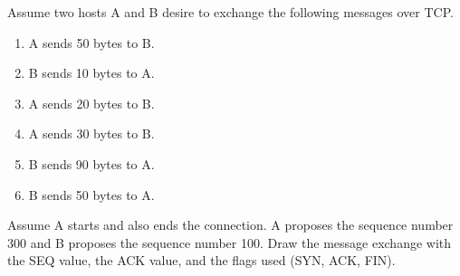 \begin{Exercise}
Assume two hosts A and B desire to exchange the following messages over TCP.

\begin{enumerate}
\item A sends 50 bytes to B.
\item B sends 10 bytes to A.
\item A sends 20 bytes to B.
\item A sends 30 bytes to B.
\item B sends 90 bytes to A.
\item B sends 50 bytes to A.
\end{enumerate}

Assume A starts and also ends the connection. A proposes the sequence number 300 and B proposes the sequence number 100. Draw the message exchange with the SEQ value, the ACK value, and the flags used (SYN, ACK, FIN).
\end{Exercise}
